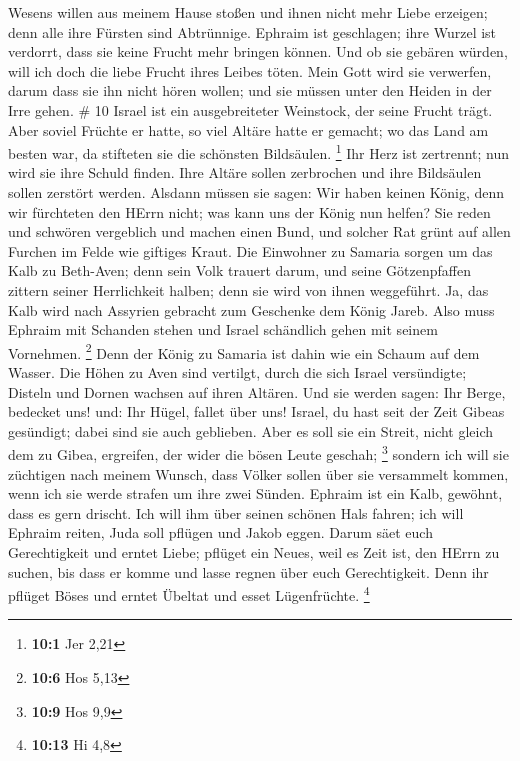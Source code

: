 Wesens willen aus meinem Hause stoßen und ihnen nicht mehr Liebe
erzeigen; denn alle ihre Fürsten sind Abtrünnige.  Ephraim
ist geschlagen; ihre Wurzel ist verdorrt, dass sie keine Frucht mehr
bringen können. Und ob sie gebären würden, will ich doch die liebe
Frucht ihres Leibes töten.  Mein Gott wird sie verwerfen,
darum dass sie ihn nicht hören wollen; und sie müssen unter den Heiden
in der Irre gehen. \# 10  Israel ist ein ausgebreiteter
Weinstock, der seine Frucht trägt. Aber soviel Früchte er hatte, so viel
Altäre hatte er gemacht; wo das Land am besten war, da stifteten sie die
schönsten Bildsäulen. \footnote{\textbf{10:1} Jer 2,21}  Ihr
Herz ist zertrennt; nun wird sie ihre Schuld finden. Ihre Altäre sollen
zerbrochen und ihre Bildsäulen sollen zerstört werden. 
Alsdann müssen sie sagen: Wir haben keinen König, denn wir fürchteten
den HErrn nicht; was kann uns der König nun helfen?  Sie
reden und schwören vergeblich und machen einen Bund, und solcher Rat
grünt auf allen Furchen im Felde wie giftiges Kraut.  Die
Einwohner zu Samaria sorgen um das Kalb zu Beth-Aven; denn sein Volk
trauert darum, und seine Götzenpfaffen zittern seiner Herrlichkeit
halben; denn sie wird von ihnen weggeführt.  Ja, das Kalb
wird nach Assyrien gebracht zum Geschenke dem König Jareb. Also muss
Ephraim mit Schanden stehen und Israel schändlich gehen mit seinem
Vornehmen. \footnote{\textbf{10:6} Hos 5,13}  Denn der König
zu Samaria ist dahin wie ein Schaum auf dem Wasser.  Die
Höhen zu Aven sind vertilgt, durch die sich Israel versündigte; Disteln
und Dornen wachsen auf ihren Altären. Und sie werden sagen: Ihr Berge,
bedecket uns! und: Ihr Hügel, fallet über uns!  Israel, du
hast seit der Zeit Gibeas gesündigt; dabei sind sie auch geblieben. Aber
es soll sie ein Streit, nicht gleich dem zu Gibea, ergreifen, der wider
die bösen Leute geschah; \footnote{\textbf{10:9} Hos 9,9} 
sondern ich will sie züchtigen nach meinem Wunsch, dass Völker sollen
über sie versammelt kommen, wenn ich sie werde strafen um ihre zwei
Sünden.  Ephraim ist ein Kalb, gewöhnt, dass es gern
drischt. Ich will ihm über seinen schönen Hals fahren; ich will Ephraim
reiten, Juda soll pflügen und Jakob eggen.  Darum säet euch
Gerechtigkeit und erntet Liebe; pflüget ein Neues, weil es Zeit ist, den
HErrn zu suchen, bis dass er komme und lasse regnen über euch
Gerechtigkeit.  Denn ihr pflüget Böses und erntet Übeltat
und esset Lügenfrüchte. \footnote{\textbf{10:13} Hi 4,8} 
